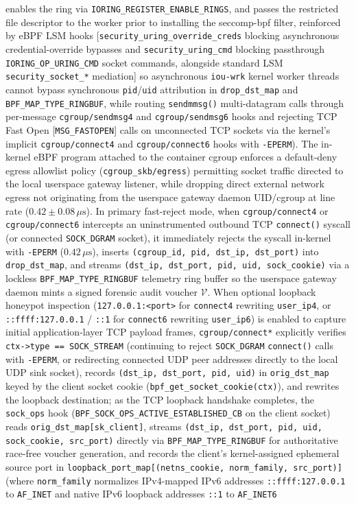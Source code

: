 \documentclass[conference,10pt]{IEEEtran}
\begin{document}
enables the ring via \texttt{IORING\_REGISTER\_ENABLE\_RINGS}, and passes the restricted file descriptor to the worker prior to installing the seccomp-bpf filter, reinforced by eBPF LSM hooks [\texttt{security\_uring\_override\_creds} blocking asynchronous credential-override bypasses and \texttt{security\_uring\_cmd} blocking passthrough \texttt{IORING\_OP\_URING\_CMD} socket commands, alongside standard LSM \texttt{security\_socket\_*} mediation] so asynchronous \texttt{iou-wrk} kernel worker threads cannot bypass synchronous \texttt{pid}/\texttt{uid} attribution in \texttt{drop\_dst\_map} and \texttt{BPF\_MAP\_TYPE\_RINGBUF}, while routing \texttt{sendmmsg()} multi-datagram calls through per-message \texttt{cgroup/sendmsg4} and \texttt{cgroup/sendmsg6} hooks and rejecting TCP Fast Open [\texttt{MSG\_FASTOPEN}] calls on unconnected TCP sockets via the kernel's implicit \texttt{cgroup/connect4} and \texttt{cgroup/connect6} hooks with \texttt{-EPERM}). The in-kernel eBPF program attached to the container cgroup enforces a default-deny egress allowlist policy (\texttt{cgroup\_skb/egress}) permitting socket traffic directed to the local userspace gateway listener, while dropping direct external network egress not originating from the userspace gateway daemon UID/cgroup at line rate ($0.42 \pm 0.08\,\mu\text{s}$). In primary fast-reject mode, when \texttt{cgroup/connect4} or \texttt{cgroup/connect6} intercepts an uninstrumented outbound TCP \texttt{connect()} syscall (or connected \texttt{SOCK\_DGRAM} socket), it immediately rejects the syscall in-kernel with \texttt{-EPERM} ($0.42\,\mu\text{s}$), inserts \texttt{(cgroup\_id, pid, dst\_ip, dst\_port)} into \texttt{drop\_dst\_map}, and streams \texttt{(dst\_ip, dst\_port, pid, uid, sock\_cookie)} via a lockless \texttt{BPF\_MAP\_TYPE\_RINGBUF} telemetry ring buffer so the userspace gateway daemon mints a signed forensic audit voucher $\mathcal{V}$. When optional loopback honeypot inspection (\texttt{127.0.0.1:<port>} for \texttt{connect4} rewriting \texttt{user\_ip4}, or \texttt{::ffff:127.0.0.1} / \texttt{::1} for \texttt{connect6} rewriting \texttt{user\_ip6}) is enabled to capture initial application-layer TCP payload frames, \texttt{cgroup/connect*} explicitly verifies \texttt{ctx->type == SOCK\_STREAM} (continuing to reject \texttt{SOCK\_DGRAM} \texttt{connect()} calls with \texttt{-EPERM}, or redirecting connected UDP peer addresses directly to the local UDP sink socket), records \texttt{(dst\_ip, dst\_port, pid, uid)} in \texttt{orig\_dst\_map} keyed by the client socket cookie (\texttt{bpf\_get\_socket\_cookie(ctx)}), and rewrites the loopback destination; as the TCP loopback handshake completes, the \texttt{sock\_ops} hook (\texttt{BPF\_SOCK\_OPS\_ACTIVE\_ESTABLISHED\_CB} on the client socket) reads \texttt{orig\_dst\_map[sk\_client]}, streams \texttt{(dst\_ip, dst\_port, pid, uid, sock\_cookie, src\_port)} directly via \texttt{BPF\_MAP\_TYPE\_RINGBUF} for authoritative race-free voucher generation, and records the client's kernel-assigned ephemeral source port in \texttt{loopback\_port\_map[(netns\_cookie, norm\_family, src\_port)]} (where \texttt{norm\_family} normalizes IPv4-mapped IPv6 addresses \texttt{::ffff:127.0.0.1} to \texttt{AF\_INET} and native IPv6 loopback addresses \texttt{::1} to \texttt{AF\_INET6} 
\end{document}
